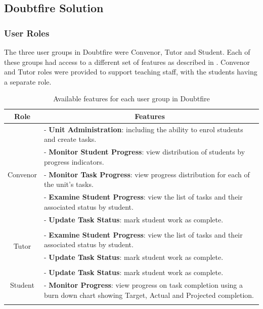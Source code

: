 
\subsection{Doubtfire Solution} %
\label{sub:doubtfire_solution}

\subsubsection{User Roles} %
\label{sub:user_roles}

The three user groups in Doubtfire were Convenor, Tutor and Student. Each of these groups had access to a different set of features as described in . Convenor and Tutor roles were provided to support teaching staff, with the students having a separate role. 

\begin{table}[htbp]
  \renewcommand{\arraystretch}{1.6}
  \centering
  \caption{Available features for each user group in Doubtfire}
  \label{tab:user_features}
  \begin{tabular}{c|p{}}
    Role & \multicolumn{1}{c}{Features} \\ \hline\hline
    \multirow{5}{*}{\begin{sideways}\parbox{14mm}{Convenor}\end{sideways}}
    & - \textbf{Unit Administration}: including the ability to enrol students and create tasks. \\
    & - \textbf{Monitor Student Progress}: view distribution of students by progress indicators. \\
    & - \textbf{Monitor Task Progress}: view progress distribution for each of the unit's tasks. \\
    & - \textbf{Examine Student Progress}: view the list of tasks and their associated status by student. \\
    & - \textbf{Update Task Status}: mark student work as complete. \\ 
    & \\
    \hline\hline
    \multirow{2}{*}{\begin{sideways}\parbox{10mm}{Tutor}\end{sideways}}
    & - \textbf{Examine Student Progress}: view the list of tasks and their associated status by student. \\
    & - \textbf{Update Task Status}: mark student work as complete. \\ 
    & \\
    \hline\hline
    \multirow{3}{*}{\begin{sideways}\parbox{11mm}{Student}\end{sideways}}
    & - \textbf{Update Task Status}: mark student work as complete. \\ 
    & - \textbf{Monitor Progress}: view progress on task completion using a burn down chart showing Target, Actual and Projected completion. \\
    & \\
  \end{tabular}
\end{table}

